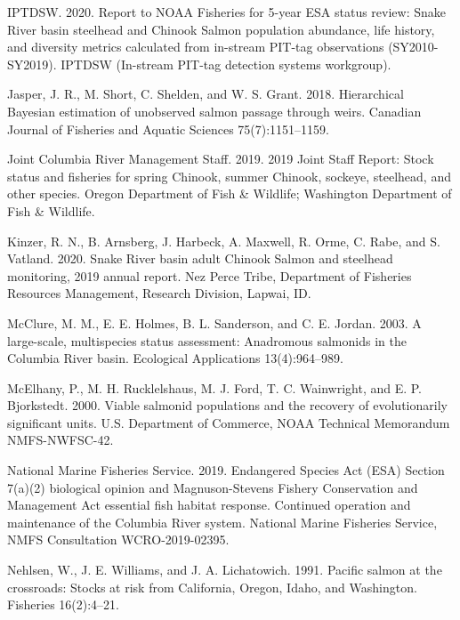\documentclass[
  12pt,
]{article}
\begin{document}
\leavevmode\hypertarget{ref-IPTDSW2020}{}%
IPTDSW. 2020. Report to NOAA Fisheries for 5-year ESA status review: Snake River basin steelhead and Chinook Salmon population abundance, life history, and diversity metrics calculated from in-stream PIT-tag observations (SY2010-SY2019). IPTDSW (In-stream PIT-tag detection systems workgroup).

\leavevmode\hypertarget{ref-Jasper2018}{}%
Jasper, J. R., M. Short, C. Shelden, and W. S. Grant. 2018. Hierarchical Bayesian estimation of unobserved salmon passage through weirs. Canadian Journal of Fisheries and Aquatic Sciences 75(7):1151--1159.

\leavevmode\hypertarget{ref-WDFW2019}{}%
Joint Columbia River Management Staff. 2019. 2019 Joint Staff Report: Stock status and fisheries for spring Chinook, summer Chinook, sockeye, steelhead, and other species. Oregon Department of Fish \& Wildlife; Washington Department of Fish \& Wildlife.

\leavevmode\hypertarget{ref-Kinzer2020}{}%
Kinzer, R. N., B. Arnsberg, J. Harbeck, A. Maxwell, R. Orme, C. Rabe, and S. Vatland. 2020. Snake River basin adult Chinook Salmon and steelhead monitoring, 2019 annual report. Nez Perce Tribe, Department of Fisheries Resources Management, Research Division, Lapwai, ID.

\leavevmode\hypertarget{ref-McClure2003}{}%
McClure, M. M., E. E. Holmes, B. L. Sanderson, and C. E. Jordan. 2003. A large-scale, multispecies status assessment: Anadromous salmonids in the Columbia River basin. Ecological Applications 13(4):964--989.

\leavevmode\hypertarget{ref-McElhany2000}{}%
McElhany, P., M. H. Rucklelshaus, M. J. Ford, T. C. Wainwright, and E. P. Bjorkstedt. 2000. Viable salmonid populations and the recovery of evolutionarily significant units. U.S. Department of Commerce, NOAA Technical Memorandum NMFS-NWFSC-42.

\leavevmode\hypertarget{ref-NMFS2019}{}%
National Marine Fisheries Service. 2019. Endangered Species Act (ESA) Section 7(a)(2) biological opinion and Magnuson-Stevens Fishery Conservation and Management Act essential fish habitat response. Continued operation and maintenance of the Columbia River system. National Marine Fisheries Service, NMFS Consultation WCRO-2019-02395.

\leavevmode\hypertarget{ref-Nehlsen1991}{}%
Nehlsen, W., J. E. Williams, and J. A. Lichatowich. 1991. Pacific salmon at the crossroads: Stocks at risk from California, Oregon, Idaho, and Washington. Fisheries 16(2):4--21.
\end{document}
